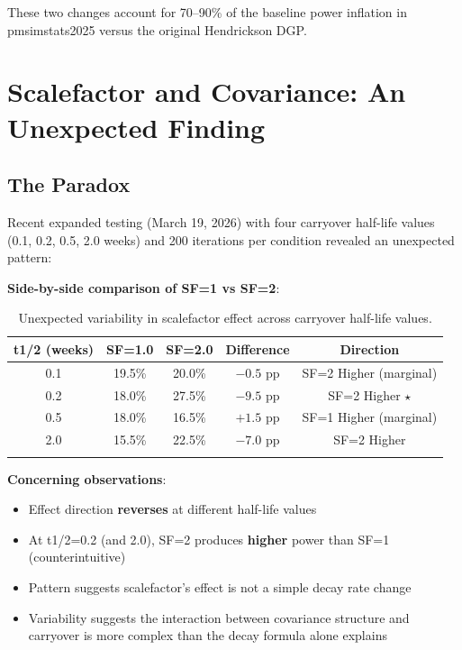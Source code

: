 \documentclass[12pt,a4paper]{article}
\begin{document}
These two changes account for 70--90\% of the baseline power inflation in pmsimstats2025 versus the original Hendrickson DGP.

\section{Scalefactor and Covariance: An Unexpected Finding}

\subsection{The Paradox}

Recent expanded testing (March 19, 2026) with four carryover half-life values (0.1, 0.2, 0.5, 2.0 weeks) and 200 iterations per condition revealed an unexpected pattern:

\textbf{Side-by-side comparison of SF=1 vs SF=2}:

\begin{center}
\begin{longtable}{ccccc}
\toprule
\textbf{t1/2 (weeks)} & \textbf{SF=1.0} & \textbf{SF=2.0} & \textbf{Difference} & \textbf{Direction} \\
\midrule
\endhead
0.1 & 19.5\% & 20.0\% & $-0.5$ pp & SF=2 Higher (marginal) \\
0.2 & 18.0\% & 27.5\% & $-9.5$ pp & SF=2 Higher \(\star\) \\
0.5 & 18.0\% & 16.5\% & $+1.5$ pp & SF=1 Higher (marginal) \\
2.0 & 15.5\% & 22.5\% & $-7.0$ pp & SF=2 Higher \\
\bottomrule
\caption{Unexpected variability in scalefactor effect across carryover half-life values.}
\end{longtable}
\end{center}

\textbf{Concerning observations}:
\begin{itemize}
\item Effect direction \textbf{reverses} at different half-life values
\item At t1/2=0.2 (and 2.0), SF=2 produces \textbf{higher} power than SF=1 (counterintuitive)
\item Pattern suggests scalefactor's effect is not a simple decay rate change
\item Variability suggests the interaction between covariance structure and carryover is more complex than the decay formula alone explains
\end{itemize}
\end{document}
